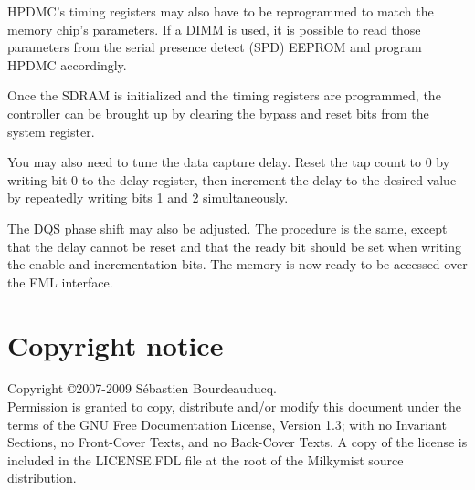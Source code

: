 \documentclass[a4paper,11pt]{article}
\begin{document}
HPDMC's timing registers may also have to be reprogrammed to match the memory chip's parameters. If a DIMM is used, it is possible to read those parameters from the serial presence detect (SPD) EEPROM and program HPDMC accordingly.

Once the SDRAM is initialized and the timing registers are programmed, the controller can be brought up by clearing the bypass and reset bits from the system register.

You may also need to tune the data capture delay. Reset the tap count to 0 by writing bit 0 to the delay register, then increment the delay to the desired value by repeatedly writing bits 1 and 2 simultaneously.

The DQS phase shift may also be adjusted. The procedure is the same, except that the delay cannot be reset and that the ready bit should be set when writing the enable and incrementation bits. The memory is now ready to be accessed over the FML interface.

\section*{Copyright notice}
Copyright \copyright 2007-2009 S\'ebastien Bourdeauducq. \\
Permission is granted to copy, distribute and/or modify this document under the terms of the GNU Free Documentation License, Version 1.3; with no Invariant Sections, no Front-Cover Texts, and no Back-Cover Texts. A copy of the license is included in the LICENSE.FDL file at the root of the Milkymist source distribution.
\end{document}
